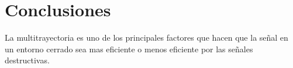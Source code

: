 \section{Conclusiones}\label{sec:conclusiones}
La multitrayectoria es uno de los principales factores que hacen que la señal en un entorno cerrado sea mas eficiente o menos eficiente por las señales destructivas.




